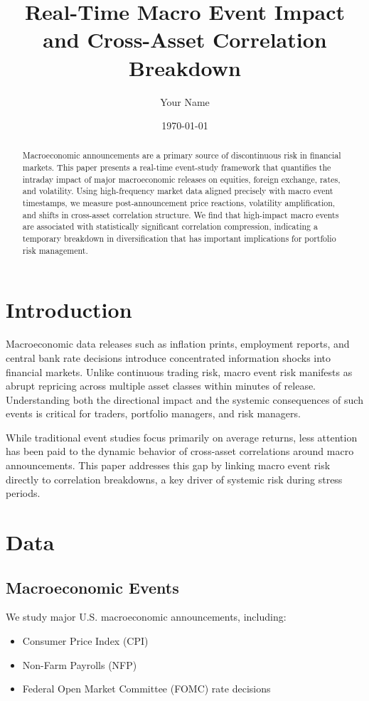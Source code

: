 \documentclass[11pt]{article}
\title{\textbf{Real-Time Macro Event Impact and Cross-Asset Correlation Breakdown}}
\author{Your Name}
\date{\today}
\begin{document}
\maketitle


\begin{abstract}
    Macroeconomic announcements are a primary source of discontinuous risk in financial markets.
    This paper presents a real-time event-study framework that quantifies the intraday impact
    of major macroeconomic releases on equities, foreign exchange, rates, and volatility.
    Using high-frequency market data aligned precisely with macro event timestamps,
    we measure post-announcement price reactions, volatility amplification, and shifts
    in cross-asset correlation structure.
    We find that high-impact macro events are associated with statistically significant
    correlation compression, indicating a temporary breakdown in diversification
    that has important implications for portfolio risk management.
    \end{abstract}

\section{Introduction}
Macroeconomic data releases such as inflation prints, employment reports, and central
bank rate decisions introduce concentrated information shocks into financial markets.
Unlike continuous trading risk, macro event risk manifests as abrupt repricing
across multiple asset classes within minutes of release.
Understanding both the directional impact and the systemic consequences of such events
is critical for traders, portfolio managers, and risk managers.

While traditional event studies focus primarily on average returns,
less attention has been paid to the dynamic behavior of cross-asset correlations
around macro announcements.
This paper addresses this gap by linking macro event risk directly to
correlation breakdowns, a key driver of systemic risk during stress periods.

\section{Data}

\subsection{Macroeconomic Events}
We study major U.S. macroeconomic announcements, including:
\begin{itemize}
    \item Consumer Price Index (CPI)
    \item Non-Farm Payrolls (NFP)
    \item Federal Open Market Committee (FOMC) rate decisions
\end{itemize}
\end{document}
